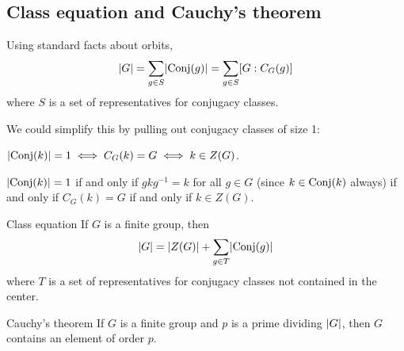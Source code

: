 \documentclass[12pt,letterpaper]{report}
\begin{document}
\pagebreak
\subsection{Class equation and Cauchy's theorem}

Using standard facts about orbits,
\[ \lvert G\rvert = \sum_{g \in S} \lvert\operatorname{Conj}(g)\rvert = \sum_{g \in S} [G : C_G(g)] \]
where $S$ is a set of representatives for conjugacy classes.

We could simplify this by pulling out conjugacy classes of size 1:

\begin{lem}{}{}
  $\lvert\operatorname{Conj}(k)\rvert = 1 \iff C_G(k) = G \iff k \in Z(G)$.
\end{lem}

\begin{thmproof}
  $\lvert\operatorname{Conj}(k)\rvert = 1$ if and only if $gkg^{-1} = k$ for all $g \in G$ (since $k \in \operatorname{Conj}(k)$
  always) if and only if $C_G(k) = G$ if and only if $k \in Z(G)$.
\end{thmproof}

\begin{thm}{Class equation}{}
  If $G$ is a finite group, then
  \[ \lvert G\rvert = \lvert Z(G)\rvert + \sum_{g \in T} \lvert\operatorname{Conj}(g)\rvert \]
  where $T$ is a set of representatives for conjugacy classes not contained in the center.
\end{thm}

\begin{thm}{Cauchy's theorem}{}
  If $G$ is a finite group and $p$ is a prime dividing $\lvert G\rvert$, then $G$ contains an element of
  order $p$.
\end{thm}
\end{document}
